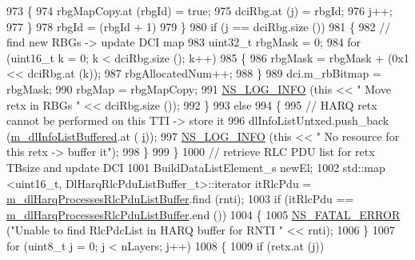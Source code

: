 \begin{DoxyCode}
973                     \{
974                       rbgMapCopy.at (rbgId) = \textcolor{keyword}{true};
975                       dciRbg.at (j) = rbgId;
976                       j++;
977                     \}
978                   rbgId = (rbgId + 1) %
979                 \}
980               \textcolor{keywordflow}{if} (j == dciRbg.size ())
981                 \{
982                   \textcolor{comment}{// find new RBGs -> update DCI map}
983                   uint32\_t rbgMask = 0;
984                   \textcolor{keywordflow}{for} (uint16\_t k = 0; k < dciRbg.size (); k++)
985                     \{
986                       rbgMask = rbgMask + (0x1 << dciRbg.at (k));
987                       rbgAllocatedNum++;
988                     \}
989                   dci.m\_rbBitmap = rbgMask;
990                   rbgMap = rbgMapCopy;
991                   \hyperlink{group__logging_gafbd73ee2cf9f26b319f49086d8e860fb}{NS\_LOG\_INFO} (\textcolor{keyword}{this} << \textcolor{stringliteral}{" Move retx in RBGs "} << dciRbg.size ());
992                 \}
993               \textcolor{keywordflow}{else}
994                 \{
995                   \textcolor{comment}{// HARQ retx cannot be performed on this TTI -> store it}
996                   dlInfoListUntxed.push\_back (\hyperlink{classns3_1_1PssFfMacScheduler_a3a7d9c7460c66767201d15a1d6f58758}{m\_dlInfoListBuffered}.at (
      \hyperlink{bernuolliDistribution_8m_a6f6ccfcf58b31cb6412107d9d5281426}{i}));
997                   \hyperlink{group__logging_gafbd73ee2cf9f26b319f49086d8e860fb}{NS\_LOG\_INFO} (\textcolor{keyword}{this} << \textcolor{stringliteral}{" No resource for this retx -> buffer it"});
998                 \}
999             \}
1000           \textcolor{comment}{// retrieve RLC PDU list for retx TBsize and update DCI}
1001           BuildDataListElement\_s newEl;
1002           std::map <uint16\_t, DlHarqRlcPduListBuffer\_t>::iterator itRlcPdu =  
      \hyperlink{classns3_1_1PssFfMacScheduler_a0f31f16c2a9f067c6189462a9797e06b}{m\_dlHarqProcessesRlcPduListBuffer}.find (rnti);
1003           \textcolor{keywordflow}{if} (itRlcPdu == \hyperlink{classns3_1_1PssFfMacScheduler_a0f31f16c2a9f067c6189462a9797e06b}{m\_dlHarqProcessesRlcPduListBuffer}.end ())
1004             \{
1005               \hyperlink{group__fatal_ga5131d5e3f75d7d4cbfd706ac456fdc85}{NS\_FATAL\_ERROR} (\textcolor{stringliteral}{"Unable to find RlcPdcList in HARQ buffer for RNTI "} << rnti);
1006             \}
1007           \textcolor{keywordflow}{for} (uint8\_t j = 0; j < nLayers; j++)
1008             \{
1009               \textcolor{keywordflow}{if} (retx.at (j))

\end{DoxyCode}
